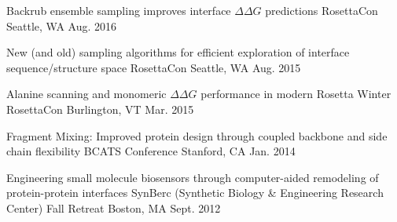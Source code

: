 

\begin{cvpresentations}

  \cvpresentation
  {Backrub ensemble sampling improves interface $\Delta\Delta G$ predictions} %
  {RosettaCon} %
  {Seattle, WA} %
  {Aug. 2016} %

  \cvpresentation
  {New (and old) sampling algorithms for efficient exploration of interface sequence/structure space} %
  {RosettaCon} %
  {Seattle, WA} %
  {Aug. 2015} %

  \cvpresentation
  {Alanine scanning and monomeric $\Delta\Delta G$ performance in modern Rosetta} %
  {Winter RosettaCon} %
  {Burlington, VT} %
  {Mar. 2015} %

  \cvpresentation
  {Fragment Mixing: Improved protein design through coupled backbone and side chain flexibility} %
  {BCATS Conference} %
  {Stanford, CA} %
  {Jan. 2014} %



  \cvpresentation
  {Engineering small molecule biosensors through computer-aided remodeling of protein-protein interfaces} %
  {SynBerc (Synthetic Biology \& Engineering Research Center) Fall Retreat} %
  {Boston, MA} %
  {Sept. 2012} %

\end{cvpresentations}

